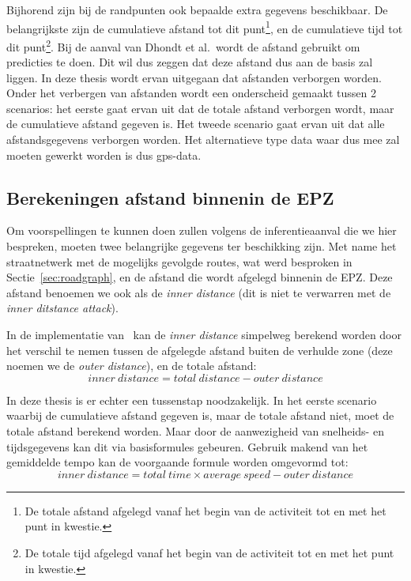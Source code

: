 Bijhorend zijn bij de randpunten ook bepaalde extra gegevens beschikbaar. De
belangrijkste zijn de cumulatieve afstand tot dit punt\footnote{De totale
    afstand afgelegd vanaf het begin van de activiteit tot en met het punt in
    kwestie.}, en de cumulatieve tijd tot dit punt\footnote{De totale tijd afgelegd
    vanaf het begin van de activiteit tot en met het punt in kwestie.}. Bij de
aanval van Dhondt et al.\ wordt de afstand gebruikt om predicties te doen. Dit
wil dus zeggen dat deze afstand dus aan de basis zal liggen. In deze thesis
wordt ervan uitgegaan dat afstanden verborgen worden. Onder het verbergen van
afstanden wordt een onderscheid gemaakt tussen 2 scenarios: het eerste gaat
ervan uit dat de totale afstand verborgen wordt, maar de cumulatieve afstand
gegeven is. Het tweede scenario gaat ervan uit dat alle afstandsgegevens
verborgen worden. Het alternatieve type data waar dus mee zal moeten gewerkt
worden is dus \ac{gps}-data.

\subsection{Berekeningen afstand binnenin de EPZ}\label{sec:berekeningen}
Om voorspellingen te kunnen doen zullen volgens de inferentieaanval die we hier
bespreken, moeten twee belangrijke gegevens ter beschikking zijn. Met name het
straatnetwerk met de mogelijks gevolgde routes, wat werd besproken in
Sectie~\ref{sec:roadgraph}, en de afstand die wordt afgelegd binnenin de
\ac{EPZ}. Deze afstand benoemen we ook als de \textit{inner distance} (dit is
niet te verwarren met de \textit{inner ditstance attack}).

In de implementatie van~\citeauthor{Dhondt} kan de \textit{inner distance}
simpelweg berekend worden door het verschil te nemen tussen de afgelegde
afstand buiten de verhulde zone (deze noemen we de \textit{outer distance}), en
de totale afstand: \[inner\ distance = total\
    distance - outer\ distance \]

In deze thesis is er echter een tussenstap noodzakelijk. In het eerste scenario
waarbij de cumulatieve afstand gegeven is, maar de totale afstand niet, moet de
totale afstand berekend worden. Maar door de aanwezigheid van snelheids- en
tijdsgegevens kan dit via basisformules gebeuren. Gebruik makend van het
gemiddelde tempo kan de voorgaande formule worden omgevormd tot: \[inner\ distance = total\ time \times average\ speed - outer\ distance \]

